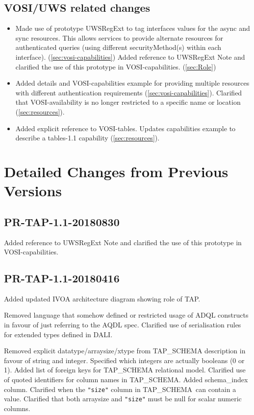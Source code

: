 \documentclass[11pt,letter]{ivoa}
\newcommand{\tapschema}{TAP\_SCHE\-MA}
\newcommand{\tapschema}{\mbox{%
  \relsize{-0.5}TAP\discretionary{-}{}{\kern-2pt\_}SCHEMA}}
\begin{document}
\subsection{VOSI/UWS related changes}

\begin{itemize}
\item Made use of prototype UWSRegExt to tag interfaces values for the async and sync resources. This allows
services to provide alternate resources for authenticated queries (using different securityMethod(s) within 
each interface). (\ref{sec:vosi-capabilities})
Added reference to UWSRegExt Note and clarified the use of this prototype in VOSI-capabilities. (\ref{sec:Role})

\item Added details and VOSI-capabilities example for providing multiple resources with different 
authentication requirements (\ref{sec:vosi-capabilities}).
Clarified that VOSI-availability is no longer restricted to a
specific name or location (\ref{sec:resources}).

\item Added explicit reference to VOSI-tables. Updates capabilities example to describe a
tables-1.1 capability (\ref{sec:resources}).
\end{itemize}

\section{Detailed Changes from Previous Versions}

\subsection{PR-TAP-1.1-20180830}

Added reference to UWSRegExt Note and clarified the use of this prototype in VOSI-capabilities.

\subsection{PR-TAP-1.1-20180416}

Added updated IVOA architecture diagram showing role of TAP.

Removed language that somehow defined or restricted usage of ADQL constructs in
favour of just referring to the AQDL spec. Clarified use of serialisation
rules for extended types defined in DALI.

Removed explicit datatype/arraysize/xtype from \tapschema{} description
in favour of string and integer. Specified which integers are actually
booleans (0 or 1). Added list of foreign keys for \tapschema{}
relational model. Clarified use of quoted identifiers for column names in 
\tapschema. Added schema\_index column. Clarified when the \verb|"size"| column 
in \tapschema\ can contain a value. Clarified that both arraysize and \verb|"size"|
must be null for scalar numeric columns.
\end{document}
